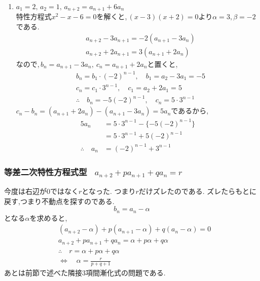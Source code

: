 \documentclass[dvipdfmx,a4paper,11pt,fleqn,openany]{jsbook}
\begin{document}
\begin{enumerate}[label=(\arabic*),parsep=3pt]
\begin{align*}
                &\therefore \quad a_n=2^n\cdot c_n=n\cdot2^{n-1}
              \end{align*}
        \item $\displaystyle a_1=2,\,a_2=1,\, a_{n+2}=a_{n+1}+6a_n$\\
              特性方程式$x^2-x-6=0$を解くと,\,$(x-3)(x+2)=0$より$\alpha=3,\beta=-2$である.
              \begin{align*}
                &a_{n+2}-3a_{n+1}=-2(a_{n+1}-3a_n)\\
                &a_{n+2}+2a_{n+1}=3(a_{n+1}+2a_n)
              \end{align*}
              なので,\,$b_n=a_{n+1}-3a_n,\ c_n=a_{n+1}+2a_n$と置くと,
              \begin{align*}
                &b_n=b_1\cdot(-2)^{n-1},\quad b_1=a_2-3a_1=-5\\
                &c_n=c_1\cdot3^{n-1},\quad c_1=a_2+2a_1=5\\
                &\therefore \quad b_n=-5(-2)^{n-1},\quad c_n=5\cdot3^{n-1}
              \end{align*}
              $c_n-b_n=(a_{n+1}+2a_n)-(a_{n+1}-3a_n)=5a_n$であるから,
              \begin{align*}
                5a_n&=5\cdot3^{n-1}-\{-5(-2)^{n-1}\}\\
                &=5\cdot3^{n-1}+5(-2)^{n-1}\\
                \therefore\quad a_n&=(-2)^{n-1}+3^{n-1}
              \end{align*}
      \end{enumerate}

    \subsubsection{等差二次特性方程式型 \, $\displaystyle a_{n+2}+pa_{n+1}+qa_n=r$}
      今度は右辺が0ではなく$r$となった.
      つまり$r$だけズレたのである.
      ズレたらもとに戻す,つまり不動点を探すのである.
      \[
        b_n=a_n-\alpha
      \]
      となる$\alpha$を求めると,
      \begin{align*}
        &(a_{n+2}-\alpha)+p(a_{n+1}-\alpha)+q(a_n-\alpha)=0\\
        &a_{n+2}+pa_{n+1}+qa_n=\alpha+p\alpha+q\alpha\\
        &\therefore \quad r=\alpha +p\alpha +q\alpha\\
        &\Leftrightarrow \quad \alpha=\frac{r}{p+q+1}
      \end{align*}
      あとは前節で述べた隣接3項間漸化式の問題である.
\end{document}
